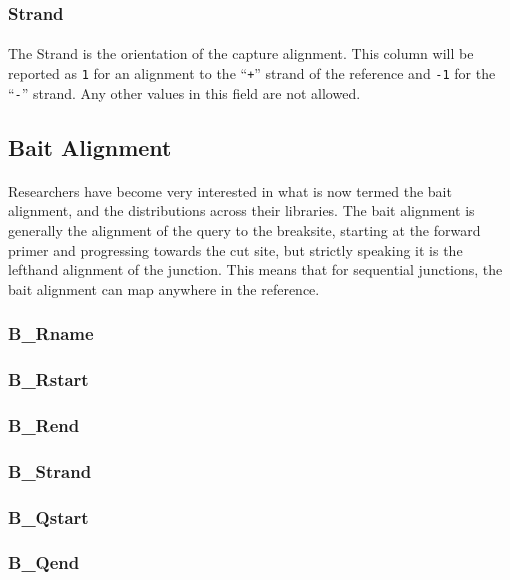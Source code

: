 \documentclass{article}
\begin{document}
\subsubsection*{Strand}
\paragraph{} The Strand is the orientation of the capture alignment. This column will be reported as \texttt{1} for an alignment to the ``\texttt{+}'' strand of the reference and \texttt{-1} for the ``\texttt{-}'' strand. Any other values in this field are not allowed.

\subsection{Bait Alignment}
\paragraph{} Researchers have become very interested in what is now termed the bait alignment, and the distributions across their libraries. The bait alignment is generally the alignment of the query to the breaksite, starting at the forward primer and progressing towards the cut site, but strictly speaking it is the lefthand alignment of the junction. This means that for sequential junctions, the bait alignment can map anywhere in the reference.
\subsubsection*{B\_Rname}
\subsubsection*{B\_Rstart}
\subsubsection*{B\_Rend}
\subsubsection*{B\_Strand}
\subsubsection*{B\_Qstart}
\subsubsection*{B\_Qend}
\end{document}
